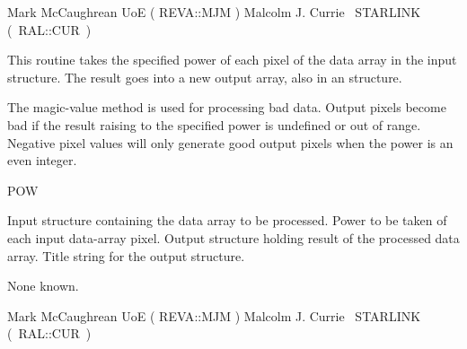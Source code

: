 {\begin{manroutinedescription}
  Mark McCaughrean UoE ( {\mantt REVA}::{\mantt MJM} )
  Malcolm J. Currie ~STARLINK \mbox{( {\mantt RAL}::{\mantt CUR} )}
\end{manroutinedescription}

\begin{manroutinedescription}
  This routine takes the specified power of each pixel of the
  data array in the input {} structure. The result goes into a
  new output array, also in an {} structure.

  The magic-value method is used for processing bad data.  Output
  pixels become bad if the result raising to the specified power is
  undefined or out of range.  Negative pixel values will only
  generate good output pixels when the power is an even integer.

  POW

\begin{manparametertable}
  Input {} structure containing the data array to be
  processed.
  Power to be taken of each input data-array pixel.
  Output {} structure holding result of the processed data
  array.
  Title string for the output {} structure.
 \mbox{{}}
\end{manparametertable}
  None known.

  Mark McCaughrean UoE ( {\mantt REVA}::{\mantt MJM} )
  Malcolm J. Currie ~STARLINK \mbox{( {\mantt RAL}::{\mantt CUR} )}
\end{manroutinedescription}

 
}
